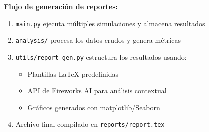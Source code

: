 \documentclass{article}
\begin{document}
\textbf{Flujo de generación de reportes:}
\begin{enumerate}
    \item \texttt{main.py} ejecuta múltiples simulaciones y almacena resultados
    \item \texttt{analysis/} procesa los datos crudos y genera métricas
    \item \texttt{utils/report\_gen.py} estructura los resultados usando:
    \begin{itemize}
        \item Plantillas LaTeX predefinidas
        \item API de Fireworks AI para análisis contextual
        \item Gráficos generados con matplotlib/Seaborn
    \end{itemize}
    \item Archivo final compilado en \texttt{reports/report.tex}
\end{enumerate}
\end{document}
